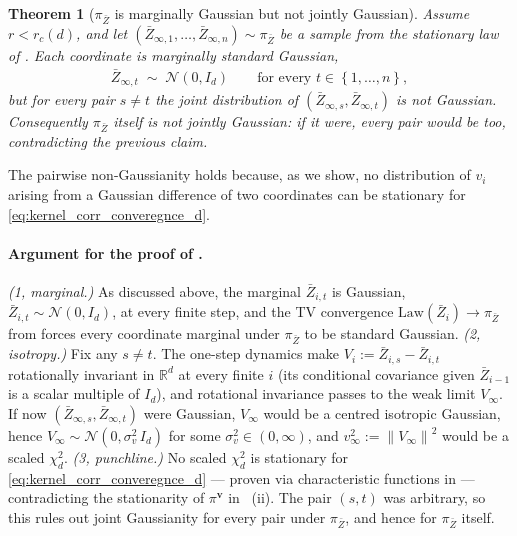 \documentclass{article}
\newcommand{\RR}{\mathbb{R}}
\newcommand{\Set}[1]{\left\{ #1 \right\}}
\newcommand{\norm}[1]{\left\|#1\right\|}
\newtheorem{theorem}{Theorem}[section]
\newcommand{\mcN}{\mathcal{N}}
\newcommand{\bZ}{\bar{Z}}
\newcommand{\bv}{\mathbf{v}}
\newcommand{\Law}{\mathrm{Law}}
\begin{document}
\begin{theorem}[$\pi_{\bZ}$ is marginally Gaussian but not jointly Gaussian]
  \label{prop:sync_not_gaussian}
  Assume $r < r_c(d)$, and let $(\bZ_{\infty,1}, \ldots, \bZ_{\infty,n}) \sim \pi_{\bZ}$ be a sample from the stationary law of . Each coordinate is marginally standard Gaussian,
  \begin{eqnarray*}
    \bZ_{\infty,t} \;\sim\; \mcN(0, I_d) \qquad \text{for every } t \in \Set{1, \ldots, n},
  \end{eqnarray*}
  but for every pair $s \ne t$ the joint distribution of $(\bZ_{\infty,s}, \bZ_{\infty,t})$ is \emph{not} Gaussian. Consequently $\pi_{\bZ}$ itself is not jointly Gaussian: if it were, every pair would be too, contradicting the previous claim.
\end{theorem}

The pairwise non-Gaussianity holds because, as we show, no distribution of $v_i$ arising from a Gaussian difference of two coordinates can be stationary for \eqref{eq:kernel_corr_converegnce_d}.

\paragraph{Argument for the proof of .}
\emph{(1, marginal.)} As discussed above, the marginal $\bZ_{i,t}$ is Gaussian, $\bZ_{i,t} \sim \mcN(0, I_d)$, at every finite step, and the TV convergence $\Law(\bZ_i) \to \pi_{\bZ}$ from  forces every coordinate marginal under $\pi_{\bZ}$ to be standard Gaussian.
\emph{(2, isotropy.)} Fix any $s \ne t$. The one-step dynamics make $V_i := \bZ_{i,s} - \bZ_{i,t}$ rotationally invariant in $\RR^d$ at every finite $i$ (its conditional covariance given $\bZ_{i-1}$ is a scalar multiple of $I_d$), and rotational invariance passes to the weak limit $V_\infty$. If now $(\bZ_{\infty,s}, \bZ_{\infty,t})$ were Gaussian, $V_\infty$ would be a centred isotropic Gaussian, hence $V_\infty \sim \mcN(0, \sigma_v^2\, I_d)$ for some $\sigma_v^2 \in (0, \infty)$, and $v_\infty^2 := \norm{V_\infty}^2$ would be a scaled $\chi^2_d$.
\emph{(3, punchline.)} No scaled $\chi^2_d$ is stationary for \eqref{eq:kernel_corr_converegnce_d} --- proven via characteristic functions in  --- contradicting the stationarity of $\pi^{\bv}$ in ~(ii). The pair $(s, t)$ was arbitrary, so this rules out joint Gaussianity for every pair under $\pi_{\bZ}$, and hence for $\pi_{\bZ}$ itself.
\end{document}
